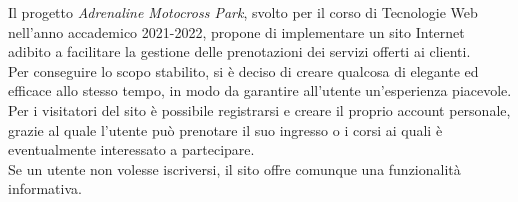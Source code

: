 Il progetto \textit{Adrenaline Motocross Park}, svolto per il corso di Tecnologie Web nell'anno accademico 2021-2022, propone di implementare un sito Internet
adibito a facilitare la gestione delle prenotazioni dei servizi offerti ai clienti.\\
Per conseguire lo scopo stabilito, si è deciso di creare qualcosa di elegante ed efficace allo stesso tempo, in modo da garantire all'utente un'esperienza
piacevole. Per i visitatori del sito è possibile registrarsi e creare il proprio account personale, grazie al quale l'utente può prenotare il suo ingresso o
i corsi ai quali è eventualmente interessato a partecipare.\\
Se un utente non volesse iscriversi, il sito offre comunque una funzionalità informativa.